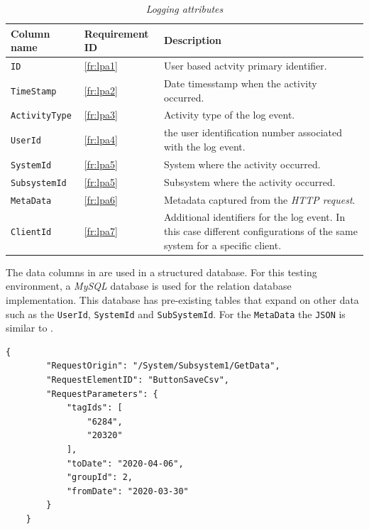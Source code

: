 \begin{table}[!htb]
	\centering
	\caption[Logging attributes]
	{\textit{Logging attributes}}
	\label{tbl:ch3_Log_Attributes}
	\begin{tabularx}{\textwidth}{llX}
		\toprule
		\textbf{Column name} & \textbf{Requirement ID} & \textbf{Description} \\
		\midrule
		\rowcolor{lightgray}
		\texttt{ID} & \ref{fr:lpa1} & User based actvity primary identifier. \\
		\texttt{TimeStamp} & \ref{fr:lpa2} & Date timesstamp when the activity occurred. \\
		\rowcolor{lightgray}
		\texttt{ActivityType} & \ref{fr:lpa3} & Activity type of the log event. \\
		\texttt{UserId} & \ref{fr:lpa4} & the user identification number associated with the log event. \\
		\rowcolor{lightgray}
		\texttt{SystemId} & \ref{fr:lpa5} & System where the activity occurred. \\
		\texttt{SubsystemId} & \ref{fr:lpa5} & Subsystem where the activity occurred. \\
		\rowcolor{lightgray}
		\texttt{MetaData} & \ref{fr:lpa6} & Metadata captured from the \textit{HTTP request}. \\
		\texttt{ClientId} & \ref{fr:lpa7} & Additional identifiers for the log event. In this case different configurations of the same system for a specific client. \\
		\bottomrule
	\end{tabularx}
\end{table}

The data columns in  are used in a structured database. For this testing environment, a \textit{MySQL} database is used for the relation database implementation. This database has pre-existing tables that expand on other data such as the \texttt{UserId}, \texttt{SystemId} and \texttt{SubSystemId}. For the \texttt{MetaData} the \texttt{JSON} is similar to .

\medskip

\begin{lstlisting}[style=json, caption={\textit{Metadata JSON}}, label={fig:ch3_MetadataJson}] 
	{
		"RequestOrigin": "/System/Subsystem1/GetData",
		"RequestElementID": "ButtonSaveCsv",
		"RequestParameters": {
			"tagIds": [
				"6284",
				"20320"
			],
			"toDate": "2020-04-06",
			"groupId": 2,
			"fromDate": "2020-03-30"
		}
	}
\end{lstlisting}

